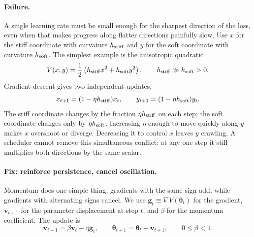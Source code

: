 \documentclass[11pt,letterpaper]{article}
\newcommand{\thet}{\bm{\theta}}
\begin{document}
\paragraph{Failure.}
A single learning rate must be small enough for the sharpest direction of the
loss, even when that makes progress along flatter directions painfully slow.
Use $x$ for the stiff coordinate with curvature $h_{\rm stiff}$ and $y$ for
the soft coordinate with curvature $h_{\rm soft}$. The simplest example
is the anisotropic quadratic
\begin{equation}\label{eq:momentum_anisotropic}
  V(x,y)=\frac12\left(h_{\rm stiff}x^2+h_{\rm soft}y^2\right),
  \qquad h_{\rm stiff}\gg h_{\rm soft}>0.
\end{equation}
Gradient descent gives two independent updates,
\begin{equation}\label{eq:anisotropic_gd_modes}
  x_{t+1}=(1-\eta h_{\rm stiff})x_t,
  \qquad
  y_{t+1}=(1-\eta h_{\rm soft})y_t.
\end{equation}
The stiff coordinate changes by the fraction \(\eta h_{\rm stiff}\) on each
step; the soft coordinate changes only by \(\eta h_{\rm soft}\). Increasing
\(\eta\) enough to move quickly along \(y\) makes \(x\) overshoot or diverge.
Decreasing it to control \(x\) leaves \(y\) crawling. A scheduler cannot
remove this simultaneous conflict: at any one step it still multiplies both
directions by the same scalar.

\paragraph{Fix: reinforce persistence, cancel oscillation.}
Momentum does one simple thing, gradients with the same sign add, while
gradients with alternating signs cancel. We use
\(\bm g_t\equiv\nabla V(\thet_t)\) for the gradient, \(\bm v_{t+1}\) for
the parameter displacement at step \(t\), and \(\beta\) for the momentum
coefficient. The update is
\begin{equation}\label{eq:momentum_velocity}
  \bm v_{t+1}=\beta\bm v_t-\eta\bm g_t,
  \qquad
  \thet_{t+1}=\thet_t+\bm v_{t+1},
  \qquad 0\leq\beta<1.
\end{equation}
\end{document}
